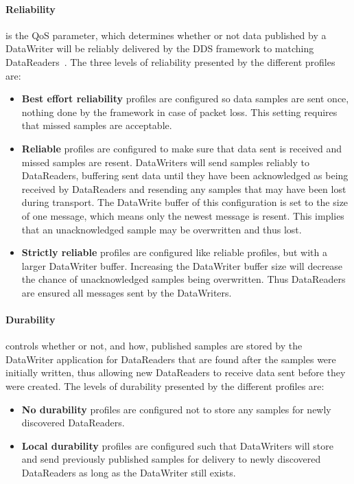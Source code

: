 \paragraph{Reliability} is the QoS parameter, which determines whether or not data published by a DataWriter will be reliably delivered by the DDS framework to matching DataReaders~\cite{rtiConnextUsersManual}. The three levels of reliability presented by the different profiles are:

\begin{itemize}
	\item \textbf{Best effort reliability} profiles are configured so data samples are sent once, nothing done by the framework in case of packet loss. This setting requires that missed samples are acceptable.
	
	\item \textbf{Reliable} profiles are configured to make sure that data sent is received and missed samples are resent. DataWriters will send samples reliably to DataReaders, buffering sent data until they have been acknowledged as being received by DataReaders and resending any samples that may have been lost during transport. The DataWrite buffer of this configuration is set to the size of one message, which means only the newest message is resent. This implies that an unacknowledged sample may be overwritten and thus lost. 
	
	\item \textbf{Strictly reliable} profiles are configured like reliable profiles, but with a larger DataWriter buffer. Increasing the DataWriter buffer size will decrease the chance of unacknowledged samples being overwritten. Thus DataReaders are ensured all messages sent by the DataWriters.
	
\end{itemize}

\paragraph{Durability} controls whether or not, and how, published samples are stored by the DataWriter application for DataReaders that are found after the samples were initially written, thus allowing new DataReaders to receive data sent before they were created. The levels of durability presented by the different profiles are:

\begin{itemize}
	\item \textbf{No durability} profiles are configured not to store any samples for newly discovered DataReaders.
	\item \textbf{Local durability} profiles are configured such that DataWriters will store and send previously published samples for delivery to newly discovered DataReaders as long as the DataWriter still exists.
\end{itemize}

